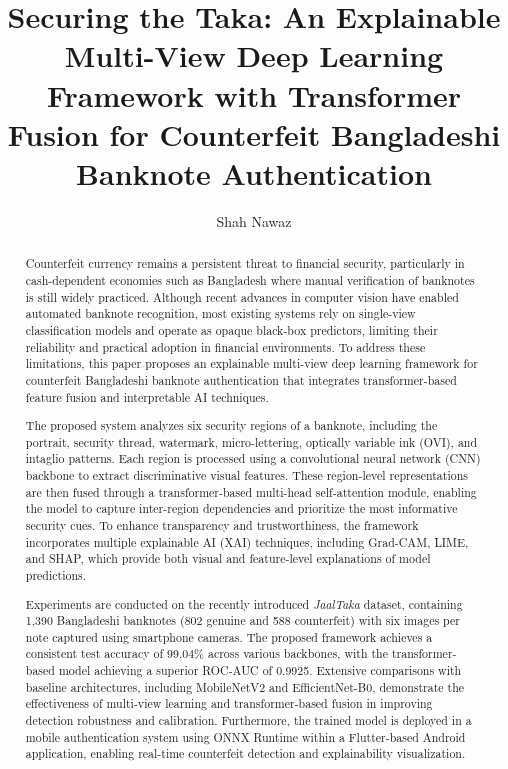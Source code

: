 \documentclass[preprint,12pt,authoryear]{elsarticle}
\begin{document}
\begin{frontmatter}

\title{Securing the Taka: An Explainable Multi-View Deep Learning Framework with Transformer Fusion for Counterfeit Bangladeshi Banknote Authentication}

\author{Shah Nawaz}

\address{Daffodil International University, Bangladesh}

\begin{abstract}

Counterfeit currency remains a persistent threat to financial security, particularly in cash-dependent economies such as Bangladesh where manual verification of banknotes is still widely practiced. Although recent advances in computer vision have enabled automated banknote recognition, most existing systems rely on single-view classification models and operate as opaque black-box predictors, limiting their reliability and practical adoption in financial environments. To address these limitations, this paper proposes an explainable multi-view deep learning framework for counterfeit Bangladeshi banknote authentication that integrates transformer-based feature fusion and interpretable AI techniques.

The proposed system analyzes six security regions of a banknote, including the portrait, security thread, watermark, micro-lettering, optically variable ink (OVI), and intaglio patterns. Each region is processed using a convolutional neural network (CNN) backbone to extract discriminative visual features. These region-level representations are then fused through a transformer-based multi-head self-attention module, enabling the model to capture inter-region dependencies and prioritize the most informative security cues. To enhance transparency and trustworthiness, the framework incorporates multiple explainable AI (XAI) techniques, including Grad-CAM, LIME, and SHAP, which provide both visual and feature-level explanations of model predictions.

Experiments are conducted on the recently introduced \textit{JaalTaka} dataset, containing 1,390 Bangladeshi banknotes (802 genuine and 588 counterfeit) with six images per note captured using smartphone cameras. The proposed framework achieves a consistent test accuracy of 99.04\% across various backbones, with the transformer-based model achieving a superior ROC-AUC of 0.9925. Extensive comparisons with baseline architectures, including MobileNetV2 and EfficientNet-B0, demonstrate the effectiveness of multi-view learning and transformer-based fusion in improving detection robustness and calibration. Furthermore, the trained model is deployed in a mobile authentication system using ONNX Runtime within a Flutter-based Android application, enabling real-time counterfeit detection and explainability visualization.


\end{abstract}
\end{frontmatter}
\end{document}
